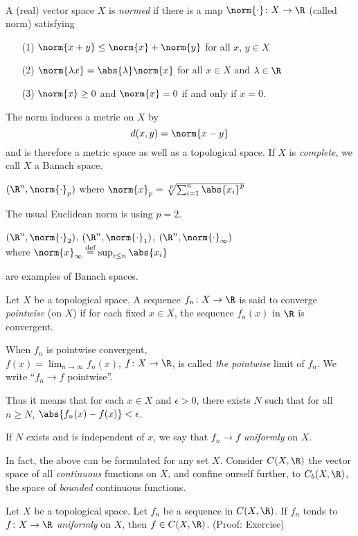  \\
A (real) vector space $X$ is \emph{normed} if there is a map $\norm{\cdot}\colon X\to\R$ (called norm) satisfying
\begin{enumerate}
\item[(1)] $\norm{x+y}\leq\norm{x}+\norm{y}$ for all $x$, $y\in X$
\item[(2)] $\norm{\lambda x}=\abs{\lambda}\norm{x}$ for all $x\in X$ and $\lambda\in\R$
\item[(3)] $\norm{x}\geq0$ and $\norm{x}=0$ if and only if $x=0$.
\end{enumerate}
The norm induces a metric on $X$ by
\[ d(x,y) = \norm{x-y} \]
and is therefore a metric space as well as a topological space.  If $X$ is \emph{complete}, we call $X$ a Banach space.

\egs $(\R^n,\norm{\cdot}_p)$ where $\norm{x}_p=\sqrt[\leftroot{-2}\uproot{2}p]{\sum_{i=1}^n\abs{x_i}^p}$

The usual Euclidean norm is using $p=2$.
\begin{center}$(\R^n,\norm{\cdot}_2)$, $(\R^n,\norm{\cdot}_1)$, $(\R^n,\norm{\cdot}_\infty)$ \\
where $\norm{x}_\infty\overset{\text{def}}{=}\sup_{i\leq n}\abs{x_i}$
\end{center}
are examples of Banach spaces.

 Let $X$ be a topological space.  A sequence $f_n\colon X\to\R$ is said to converge \emph{pointwise} (on $X$) if for each fixed $x\in X$, the sequence $f_n(x)$ in $\R$ is convergent.

When $f_n$ is pointwise convergent, \\%
$f(x)=\lim_{n\to\infty}f_n(x)$, $f\colon X\to\R$, is called \emph{the pointwise} limit of $f_n$.  We write ``$f_n\to f$ pointwise''.

Thus it means that for each $x\in X$ and $\epsilon>0$, there exists $N$ such that for all $n\geq N$, $\abs{f_n(x)-f(x)}<\epsilon$.

If $N$ exists and is independent of $x$, we say that $f_n\to f$ \emph{uniformly} on $X$.

In fact, the above can be formulated for any set $X$.  Consider $C(X,\R)$ the vector space of all \emph{continuous} functions on $X$, and confine ourself further, to $C_b(X,\R)$, the space of \emph{bounded} continuous functions.

\thm Let $X$ be a topological space.  Let $f_n$ be a sequence in $C(X,\R)$.  If $f_n$ tends to $f\colon X\to\R$ \emph{uniformly} on $X$, then $f\in C(X,\R)$.  (Proof: Exercise)


